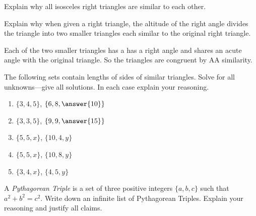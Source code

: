\documentclass[nooutcomes]{ximera}
\begin{document}
\begin{question}Explain why all isosceles right triangles are similar to each other. 
\begin{freeResponse}
\begin{hint}
\end{hint}
\end{freeResponse}
\end{question}

\begin{question}
Explain why when given a right triangle, the altitude of the
  right angle divides the triangle into two smaller triangles each
  similar to the original right triangle.
\begin{freeResponse}
\begin{hint}
Each of the two smaller triangles has a has a right angle and shares an acute angle with the original triangle.  So the triangles are congruent by AA similarity.  
\end{hint}
\end{freeResponse}
\end{question}

\begin{question}
The following sets contain lengths of sides of similar
  triangles. Solve for all unknowns---give all solutions. In each case
  explain your reasoning.
\begin{enumerate}
\item $\{3,4,5\}$, $\{6,8,\answer{10}\}$
\item $\{3,3,5\}$, $\{9,9,\answer{15}\}$
\item $\{5,5,x\}$, $\{10,4,y\}$
\item $\{5,5,x\}$, $\{10,8,y\}$
\item $\{3,4,x\}$, $\{4,5,y\}$ 
\end{enumerate}
\begin{freeResponse}
\begin{hint}
\end{hint}
\end{freeResponse}
\end{question}

\begin{question}
A \textit{Pythagorean Triple} is a set
  of three positive integers $\{a,b,c\}$ such that $a^2 + b^2 =
  c^2$. Write down an infinite list of Pythagorean Triples. Explain
  your reasoning and justify all claims.
\begin{freeResponse}
\begin{hint}

\end{hint}
\end{freeResponse}
\end{question}
\end{document}
